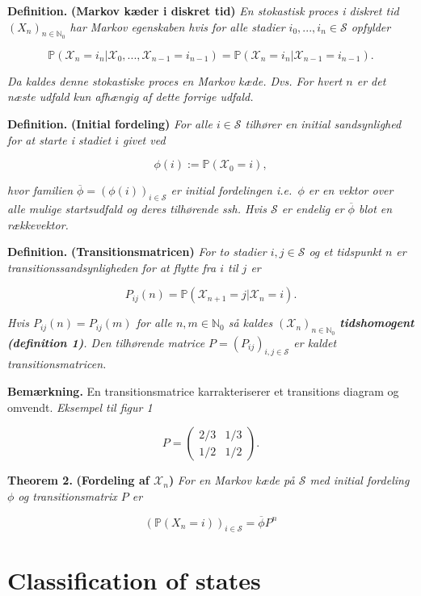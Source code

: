 \documentclass[a4paper,12pt,openany]{book}
\begin{document}
\textbf{Definition.} \textbf{(Markov kæder i diskret tid)} \emph{En stokastisk proces i diskret tid \((X_n)_{n\in\mathbb{N}_0}\) har \textit{Markov egenskaben} hvis for alle stadier \(i_0,...,i_n\in\mathcal{S}\) opfylder}

\[
\mathbb{P}(\mathcal{X}_n=i_n\vert \mathcal{X}_0,...,\mathcal{X}_{n-1}=i_{n-1})=\mathbb{P}(\mathcal{X}_n=i_n \vert \mathcal{X}_{n-1}=i_{n-1}).
\]

\emph{Da kaldes denne stokastiske proces en Markov kæde. Dvs. For hvert \(n\) er det næste udfald kun afhængig af dette forrige udfald.}

\textbf{Definition.} \textbf{(Initial fordeling)} \emph{For alle \(i\in\mathcal{S}\) tilhører en initial sandsynlighed for at starte i stadiet \(i\) givet ved}

\[
\phi(i):=\mathbb{P}(\mathcal{X}_0=i),
\]

\emph{hvor familien \(\overline{\phi}=(\phi(i))_{i\in\mathcal{S}}\) er initial fordelingen i.e.~\(\phi\) er en vektor over alle mulige startsudfald og deres tilhørende ssh. Hvis \(\mathcal{S}\) er endelig er \(\overline{\phi}\) blot en rækkevektor.}

\textbf{Definition.} \textbf{(Transitionsmatricen)} \emph{For to stadier \(i,j\in\mathcal{S}\) og et tidspunkt \(n\) er transitionssandsynligheden for at flytte fra \(i\) til \(j\) er}

\[
P_{ij}(n)=\mathbb{P}(\mathcal{X}_{n+1}=j \vert \mathcal{X}_n=i).
\]

\emph{Hvis \(P_{ij}(n)=P_{ij}(m)\) for alle \(n,m\in\mathbb{N}_0\) så kaldes \((\mathcal{X}_n)_{n\in\mathbb{N}_0}\) \textbf{tidshomogent (definition 1)}. Den tilhørende matrice \(P=(P_{ij})_{i,j\in\mathcal{S}}\) er kaldet transitionsmatricen.}

\textbf{Bemærkning.} En transitionsmatrice karrakteriserer et transitions diagram og omvendt. \textit{Eksempel til figur 1}

\[
P=\begin{pmatrix}
2/3 & 1/3\\
1/2 & 1/2
\end{pmatrix}.
\]

\textbf{Theorem 2.} \textbf{(Fordeling af \(\mathcal{X}_n\))} \emph{For en Markov kæde på \(\mathcal{S}\) med initial fordeling \(\phi\) og transitionsmatrix \(P\) er}

\[
(\mathbb{P}(X_n=i))_{i\in\mathcal{S}}=\overline{\phi} P^n
\]

\hypertarget{classification-of-states}{%
\section{Classification of states}\label{classification-of-states}}
\end{document}
